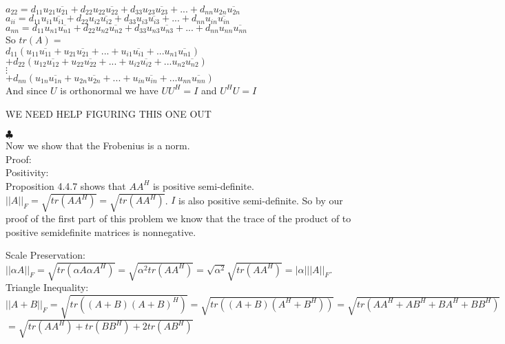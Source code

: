 \documentclass[12pt]{article}
\newenvironment{problems}{\begin{list}{}{\setlength{\labelwidth}{.7in}}}{\end{list}}
\begin{document}
\begin{problems}
$a_{22} = d_{11}u_{21}\overline{u_{21}} + d_{22}u_{22}\overline{u_{22}} + d_{33}u_{23}\overline{u_{23}} + ... + d_{nn}u_{2n}\overline{u_{2n}}$\\

 $a_{ii} = d_{11}u_{i1}\overline{u_{i1}} + d_{22}u_{i2}\overline{u_{i2}} + d_{33}u_{i3}\overline{u_{i3}} + ... + d_{nn}u_{in}\overline{u_{in}}$\\

$a_{nn} = d_{11}u_{n1}\overline{u_{n1}} + d_{22}u_{n2}\overline{u_{n2}} + d_{33}u_{n3}\overline{u_{n3}} + ... + d_{nn}u_{nn}\overline{u_{nn}}$\\ 
 

So $tr(A) =$\\

$d_{11}( u_{11}\overline{u_{11}} +  u_{21}\overline{u_{21}} + ... + u_{i1}\overline{u_{i1}} + ...u_{n1}\overline{u_{n1}} )$\\
$+ d_{22}( u_{12}\overline{u_{12}} +  u_{22}\overline{u_{22}} + ... + u_{i2}\overline{u_{i2}} + ...u_{n2}\overline{u_{n2}} )$\\
$\vdots$\\
$+ d_{nn}( u_{1n}\overline{u_{1n}} +  u_{2n}\overline{u_{2n}} + ... + u_{in}\overline{u_{in}} + ...u_{nn}\overline{u_{nn}} )$\\

And since $U$ is orthonormal we have $UU^H = I$ and $U^HU = I$

WE NEED HELP FIGURING THIS ONE OUT

 \hfill $\clubsuit$\\

Now we show that the Frobenius is a norm.\\
Proof:\\
Positivity:\\
Proposition 4.4.7 shows that $AA^H$ is positive semi-definite. $||A||_F = \sqrt{tr(AA^H)} = \sqrt{tr(AA^H)}$. $I$ is also positive semi-definite. So by our proof of the first part of this problem we know that the trace of the product of to positive semidefinite matrices is nonnegative. 

Scale Preservation:\\$||\alpha A||_F =\sqrt{tr(\alpha A \alpha A^H)} = \sqrt{  \alpha^2tr(AA^H)} = \sqrt{\alpha^2}\sqrt{tr(AA^H)} = |\alpha|||A||_F$.\\  

Triangle Inequality:\\
$||A+B||_F = \sqrt{ tr( (A+B)(A+B)^H    )     } = \sqrt{ tr( (A+B)(A^H+B^H)    )     } = \sqrt{ tr( AA^H + AB^H +BA^H+BB^H    )     }$\\
$=\sqrt{tr(AA^H) + tr(BB^H) + 2tr(AB^H)       }$\\


\end{problems}
\end{document}
